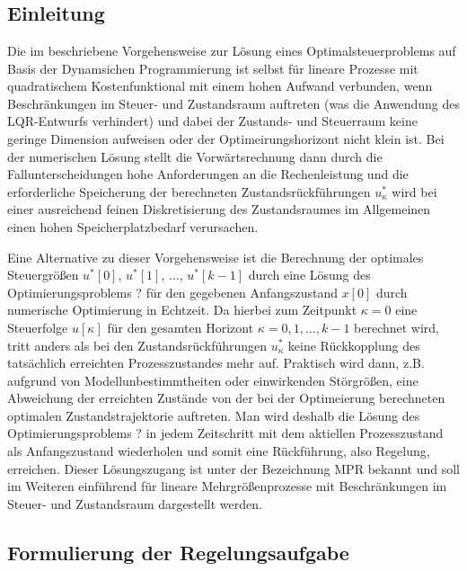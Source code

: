 \chapter{}
\section{Einleitung}
Die im  beschriebene Vorgehensweise zur Lösung eines Optimalsteuerproblems auf Basis der Dynamsichen Programmierung ist selbst für lineare
Prozesse mit quadratischem Kostenfunktional mit einem hohen Aufwand verbunden, wenn Beschränkungen im Steuer- und Zustandsraum auftreten (was die Anwendung des \ac{LQR}-Entwurfs
verhindert) und dabei der Zustands- und Steuerraum keine geringe Dimension aufweisen oder der Optimeirungshorizont nicht klein ist. Bei der numerischen Lösung stellt die
Vorwärtsrechnung dann durch die Fallunterscheidungen hohe Anforderungen an die Rechenleistung und die erforderliche Speicherung der berechneten Zustandsrückführungen
$u_{\kappa}^{\ast}$ wird bei einer ausreichend feinen Diskretisierung des Zustandsraumes im Allgemeinen einen hohen Speicherplatzbedarf verursachen. 

Eine Alternative zu dieser Vorgehensweise ist die Berechnung der optimales Steuergrößen $u^{\ast}[0]$, $u^{\ast}[1]$, $\ldots$, $u^{\ast}[k-1]$ durch eine Lösung des
Optimierungsproblems ? für den gegebenen Anfangszustand $x[0]$ durch numerische Optimierung in Echtzeit. Da hierbei zum Zeitpunkt $\kappa=0$ eine Steuerfolge $u[\kappa]$ für den
gesamten Horizont $\kappa=0,1,\ldots,k-1$ berechnet wird, tritt anders als bei den Zustandsrückführungen $u_{\kappa}^{\ast}$ keine Rückkopplung des tatsächlich erreichten
Prozesszustandes mehr auf. Praktisch wird dann, z.B. aufgrund von Modellunbestimmtheiten oder einwirkenden Störgrößen, eine Abweichung der erreichten Zustände von der bei der
Optimeierung berechneten optimalen Zustandstrajektorie auftreten. Man wird deshalb die Lösung des Optimierungsproblems ? in jedem Zeitschritt mit dem aktiellen Prozesszustand als
Anfangszustand wiederholen und somit eine Rückführung, also Regelung, erreichen. Dieser Lösungszugang ist unter der Bezeichnung \ac{MPR} bekannt und soll im Weiteren einführend für
lineare Mehrgrößenprozesse mit Beschränkungen im Steuer- und Zustandsraum dargestellt werden.

\section{Formulierung der Regelungsaufgabe}
